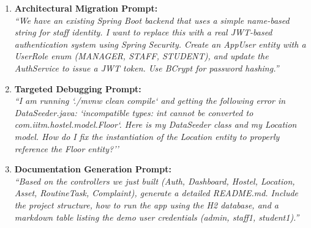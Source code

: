 \documentclass[11pt,a4paper]{article}
\begin{document}
\begin{enumerate}
    \item \textbf{Architectural Migration Prompt:} \\
    \textit{``We have an existing Spring Boot backend that uses a simple name-based string for staff identity. I want to replace this with a real JWT-based authentication system using Spring Security. Create an AppUser entity with a UserRole enum (MANAGER, STAFF, STUDENT), and update the AuthService to issue a JWT token. Use BCrypt for password hashing.''}
    
    \item \textbf{Targeted Debugging Prompt:} \\
    \textit{``I am running `./mvnw clean compile` and getting the following error in DataSeeder.java: `incompatible types: int cannot be converted to com.iitm.hostel.model.Floor`. Here is my DataSeeder class and my Location model. How do I fix the instantiation of the Location entity to properly reference the Floor entity?''}
    
    \item \textbf{Documentation Generation Prompt:} \\
    \textit{``Based on the controllers we just built (Auth, Dashboard, Hostel, Location, Asset, RoutineTask, Complaint), generate a detailed README.md. Include the project structure, how to run the app using the H2 database, and a markdown table listing the demo user credentials (admin, staff1, student1).''}
\end{enumerate}
\end{document}
